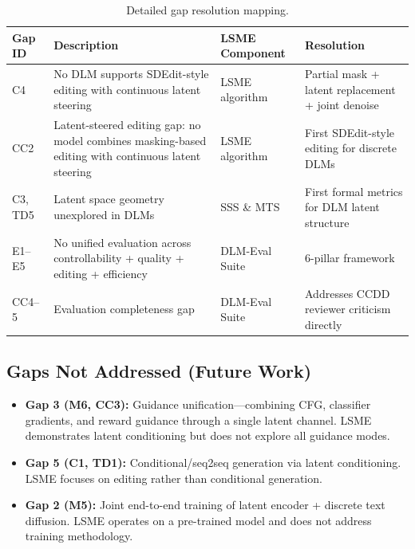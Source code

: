 \documentclass{article}
\begin{document}
\begin{table}[h]
\centering
\caption{Detailed gap resolution mapping.}
\small
\begin{tabular}{p{1.5cm}p{4.5cm}p{2.5cm}p{4cm}}
\toprule
\textbf{Gap ID} & \textbf{Description} & \textbf{LSME Component} & \textbf{Resolution} \\
\midrule
C4 & No DLM supports SDEdit-style editing with continuous latent steering & LSME algorithm & Partial mask + latent replacement + joint denoise \\
\addlinespace
CC2 & Latent-steered editing gap: no model combines masking-based editing with continuous latent steering & LSME algorithm & First SDEdit-style editing for discrete DLMs \\
\addlinespace
C3, TD5 & Latent space geometry unexplored in DLMs & SSS \& MTS & First formal metrics for DLM latent structure \\
\addlinespace
E1--E5 & No unified evaluation across controllability + quality + editing + efficiency & DLM-Eval Suite & 6-pillar framework \\
\addlinespace
CC4--5 & Evaluation completeness gap & DLM-Eval Suite & Addresses CCDD reviewer criticism directly \\
\bottomrule
\end{tabular}
\end{table}

\subsection{Gaps Not Addressed (Future Work)}

\begin{itemize}
    \item \textbf{Gap 3 (M6, CC3):} Guidance unification---combining CFG, classifier gradients, and reward guidance through a single latent channel. LSME demonstrates latent conditioning but does not explore all guidance modes.
    \item \textbf{Gap 5 (C1, TD1):} Conditional/seq2seq generation via latent conditioning. LSME focuses on editing rather than conditional generation.
    \item \textbf{Gap 2 (M5):} Joint end-to-end training of latent encoder + discrete text diffusion. LSME operates on a pre-trained model and does not address training methodology.
\end{itemize}



\end{document}
